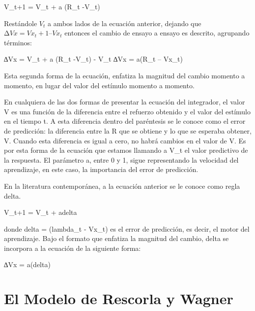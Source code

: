 \documentclass[
  a4paper,
  DIV=11,
  numbers=noendperiod]{scrreprt}
\begin{document}
\(%
\)V\_t+1 = V\_t + a (R\_t -V\_t)\(%
\)

Restándole \(V_t\) a ambos lados de la ecuación anterior, dejando que
\(∆Vx = Vx_t+1 – Vx_t\) entonces el cambio de ensayo a ensayo es
descrito, agrupando términos:

\(%
\)∆Vx = V\_t + a (R\_t -V\_t) - V\_t\(%
\) \(%
\)∆Vx = a(R\_t -- Vx\_t)\(%
\)

Esta segunda forma de la ecuación, enfatiza la magnitud del cambio
momento a momento, en lugar del valor del estímulo momento a momento.

En cualquiera de las dos formas de presentar la ecuación del integrador,
el valor V es una función de la diferencia entre el refuerzo obtenido y
el valor del estímulo en el tiempo t. A esta diferencia dentro del
paréntesis se le conoce como el error de predicción: la diferencia entre
la R que se obtiene y lo que se esperaba obtener, V. Cuando esta
diferencia es igual a cero, no habrá cambios en el valor de V. Es por
esta forma de la ecuación que estamos llamando a V\_t el valor
predictivo de la respuesta. El parámetro a, entre 0 y 1, sigue
representando la velocidad del aprendizaje, en este caso, la importancia
del error de predicción.

En la literatura contemporánea, a la ecuación anterior se le conoce como
regla delta.

\(%
\)V\_t+1 = V\_t + adelta\(%
\)

donde \(%
\)delta = (lambda\_t - Vx\_t)\(%
\) es el error de predicción, es decir, el motor del aprendizaje. Bajo
el formato que enfatiza la magnitud del cambio, delta se incorpora a la
ecuación de la siguiente forma:

\(%
\)∆Vx = a(delta)\(%
\)


\chapter{El Modelo de Rescorla y
Wagner}\label{el-modelo-de-rescorla-y-wagner}
\end{document}
